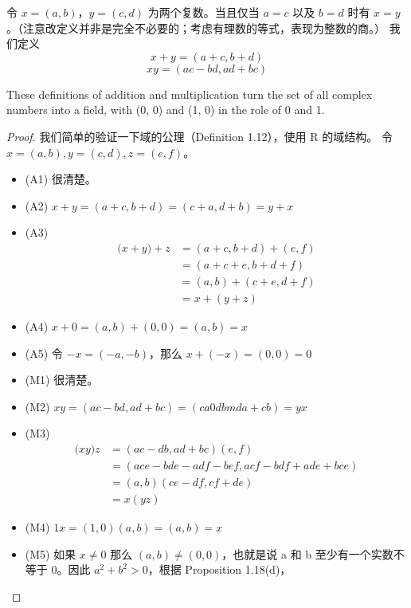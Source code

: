 \documentclass[../poma-note.tex]{subfiles}
\begin{document}
令 $x=(a,b)$，$y=(c,d)$ 为两个复数。当且仅当 $a=c$ 以及 $b=d$ 时有 $x=y$。（注意改定义并非是完全不必要的；考虑有理数的等式，表现为整数的商。）
我们定义
\[x+y=(a+c,b+d)\]
\[xy=(ac-bd,ad+bc)\]

\setcounter{theorem}{24}
\begin{theorem}
	These definitions of addition and multiplication turn the set of all complex numbers into a field, with (0, 0)
	and (1, 0) in the role of 0 and 1.
\end{theorem}

\begin{proof}
	我们简单的验证一下域的公理（Definition 1.12），使用 R 的域结构。
	令 $x=(a,b), y=(c,d), z=(e,f)$。
	\begin{itemize}
		\item[] (A1) 很清楚。
		\item[] (A2) $x+y = (a+c,b+d) = (c+a,d+b) = y+x$
		\item[] (A3)
			\vspace{-26pt}
			\begin{align*}
				\mathcal (x+y)+z & = (a+c,b+d) + (e,f) \\
				                 & = (a+c+e, b+d+f)    \\
				                 & = (a,b) + (c+e,d+f) \\
				                 & = x+(y+z)
			\end{align*}
		\item[] (A4) $x+0 = (a,b) + (0,0) = (a,b) = x$
		\item[] (A5) 令 $-x = (-a,-b)$，那么 $x+(-x) = (0,0) = 0$
		\item[] (M1) 很清楚。
		\item[] (M2) $xy = (ac-bd,ad+bc) = (ca0dbmda+cb) = yx$
		\item[] (M3)
			\vspace{-26pt}
			\begin{align*}
				\mathcal (xy)z & = (ac-db,ad+bc)(e,f)                \\
				               & = (ace-bde-adf-bef,acf-bdf+ade+bce) \\
				               & = (a,b)(ce-df,cf+de)                \\
				               & = x(yz)
			\end{align*}
		\item[] (M4) $1x  =(1,0)(a,b) = (a,b) = x$
		\item[] (M5) 如果 $x \ne 0$ 那么 $(a,b) \ne (0,0)$，也就是说 a 和 b 至少有一个实数不等于 0。因此 $a^2+b^2>0$，根据 Proposition 1.18(d)，

\end{itemize}
\end{proof}
\end{document}
